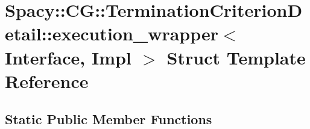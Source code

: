\hypertarget{structSpacy_1_1CG_1_1TerminationCriterionDetail_1_1execution__wrapper}{\section{\-Spacy\-:\-:\-C\-G\-:\-:\-Termination\-Criterion\-Detail\-:\-:execution\-\_\-wrapper$<$ \-Interface, \-Impl $>$ \-Struct \-Template \-Reference}
\label{structSpacy_1_1CG_1_1TerminationCriterionDetail_1_1execution__wrapper}
}
\subsection*{\-Static \-Public \-Member \-Functions}
